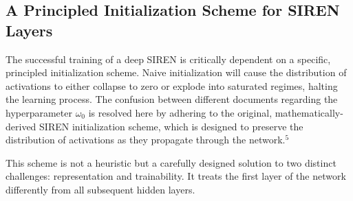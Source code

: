 \subsection{A Principled Initialization Scheme for SIREN Layers}

The successful training of a deep SIREN is critically dependent on a specific, principled initialization scheme. Naive initialization will cause the distribution of activations to either collapse to zero or explode into saturated regimes, halting the learning process. The confusion between different documents regarding the hyperparameter $\omega_0$ is resolved here by adhering to the original, mathematically-derived SIREN initialization scheme, which is designed to preserve the distribution of activations as they propagate through the network.$^5$

This scheme is not a heuristic but a carefully designed solution to two distinct challenges: representation and trainability. It treats the first layer of the network differently from all subsequent hidden layers.

